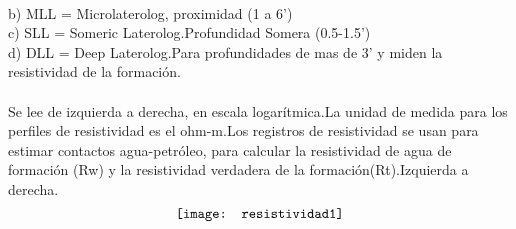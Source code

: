 \documentclass[10pt,a4paper]{report}
\begin{document}
\\ b) MLL = Microlaterolog, proximidad (1 a 6')
\\ c) SLL = Someric Laterolog.Profundidad Somera (0.5-1.5')
\\ d) DLL = Deep Laterolog.Para profundidades de mas de 3' y miden la resistividad de la formación.
 \\\\ Se lee de izquierda a derecha, en escala logarítmica.La unidad de medida para los perfiles de resistividad es el ohm-m.Los registros de resistividad se usan para estimar contactos agua-petróleo, para calcular la resistividad de agua de formación (Rw) y la resistividad verdadera de la formación(Rt).Izquierda a derecha.
 \\ $$\\  \texttt{[image: resistividad1]}$$ 
 
\end{document}
